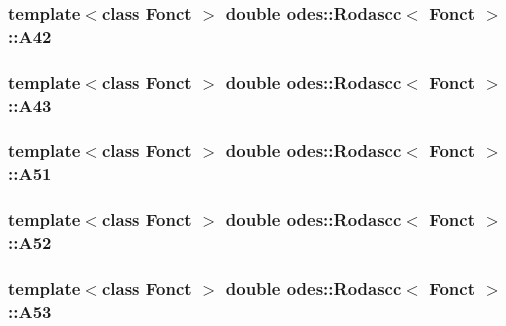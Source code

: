 \hypertarget{classodes_1_1Rodascc_af4412ccfa9d2057e6f7f17dac8a98e30}{
\subsubsection[{A42}]{\setlength{\rightskip}{0pt plus 5cm}template$<$class Fonct $>$ double {\bf odes\-::\-Rodascc}$<$ Fonct $>$\-::A42\hspace{0.3cm}{\ttfamily [private]}}}\label{classodes_1_1Rodascc_af4412ccfa9d2057e6f7f17dac8a98e30}
\hypertarget{classodes_1_1Rodascc_acadbdb3873d2211266cc99f47d2b6bb4}{
\subsubsection[{A43}]{\setlength{\rightskip}{0pt plus 5cm}template$<$class Fonct $>$ double {\bf odes\-::\-Rodascc}$<$ Fonct $>$\-::A43\hspace{0.3cm}{\ttfamily [private]}}}\label{classodes_1_1Rodascc_acadbdb3873d2211266cc99f47d2b6bb4}
\hypertarget{classodes_1_1Rodascc_a2e5e42ec31489631cbdcf6ab1292bb38}{
\subsubsection[{A51}]{\setlength{\rightskip}{0pt plus 5cm}template$<$class Fonct $>$ double {\bf odes\-::\-Rodascc}$<$ Fonct $>$\-::A51\hspace{0.3cm}{\ttfamily [private]}}}\label{classodes_1_1Rodascc_a2e5e42ec31489631cbdcf6ab1292bb38}
\hypertarget{classodes_1_1Rodascc_afdeaa138936b4f80eff32def6a4b9595}{
\subsubsection[{A52}]{\setlength{\rightskip}{0pt plus 5cm}template$<$class Fonct $>$ double {\bf odes\-::\-Rodascc}$<$ Fonct $>$\-::A52\hspace{0.3cm}{\ttfamily [private]}}}\label{classodes_1_1Rodascc_afdeaa138936b4f80eff32def6a4b9595}
\hypertarget{classodes_1_1Rodascc_ac2b02599a93b12953db030cc1ebabd2b}{
\subsubsection[{A53}]{\setlength{\rightskip}{0pt plus 5cm}template$<$class Fonct $>$ double {\bf odes\-::\-Rodascc}$<$ Fonct $>$\-::A53\hspace{0.3cm}{\ttfamily [private]}}}\label{classodes_1_1Rodascc_ac2b02599a93b12953db030cc1ebabd2b}
